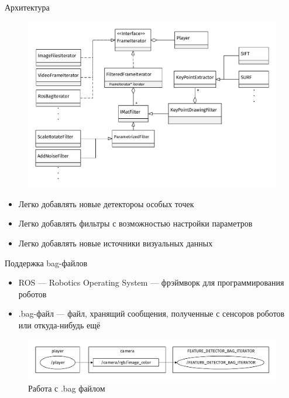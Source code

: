 \begin{frame}{Архитектура}
\begin{figure}
\centering
\includegraphics[scale=0.42]{data/diagram.pdf}
\end{figure}
\begin{scriptsize}
\begin{itemize}
	\item Легко добавлять новые детектороы особых точек
	\item Легко добавлять фильтры с возможностью настройки параметров
	\item Легко добавлять новые источники визуальных данных
\end{itemize}
\end{scriptsize}
\end{frame}

\begin{frame}{Поддержка bag-файлов}
\begin{itemize}
\item ROS --- Robotics Operating System --- фрэймворк для программирования роботов
\item .bag-файл --- файл, хранящий сообщения, полученные с сенсоров роботов или откуда-нибудь ещё
\end{itemize}
\begin{figure}
\centering
\includegraphics[scale=0.5]{data/ros_flow.pdf}
\caption{Работа с .bag файлом}
\end{figure}
\end{frame}


